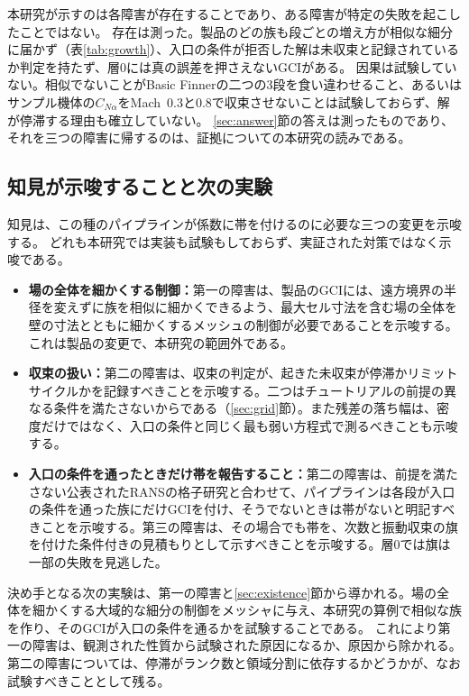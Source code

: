 \documentclass[twocolumn]{labreport}
\newcommand{\CNa}{C_{N\alpha}}
\begin{document}
本研究が示すのは各障害が存在することであり、ある障害が特定の失敗を起こしたことではない。
存在は測った。製品のどの族も段ごとの増え方が相似な細分に届かず（表\ref{tab:growth}）、入口の条件が拒否した解は未収束と記録されているか判定を持たず、層0には真の誤差を押さえないGCIがある。
因果は試験していない。相似でないことがBasic Finnerの二つの3段を食い違わせること、あるいはサンプル機体の$\CNa$をMach~0.3と0.8で収束させないことは試験しておらず、解が停滞する理由も確立していない。
\ref{sec:answer}節の答えは測ったものであり、それを三つの障害に帰するのは、証拠についての本研究の読みである。

\subsection{知見が示唆することと次の実験}
\label{sec:implications}

知見は、この種のパイプラインが係数に帯を付けるのに必要な三つの変更を示唆する。
どれも本研究では実装も試験もしておらず、実証された対策ではなく示唆である。
\begin{itemize}
\item \textbf{場の全体を細かくする制御：}第一の障害は、製品のGCIには、遠方境界の半径を変えずに族を相似に細かくできるよう、最大セル寸法を含む場の全体を壁の寸法とともに細かくするメッシュの制御が必要であることを示唆する。
これは製品の変更で、本研究の範囲外である。
\item \textbf{収束の扱い：}第二の障害は、収束の判定が、起きた未収束が停滞かリミットサイクルかを記録すべきことを示唆する。二つはチュートリアルの前提の異なる条件を満たさないからである（\ref{sec:grid}節）。また残差の落ち幅は、密度だけではなく、入口の条件と同じく最も弱い方程式で測るべきことも示唆する。
\item \textbf{入口の条件を通ったときだけ帯を報告すること：}第二の障害は、前提を満たさない公表されたRANSの格子研究と合わせて、パイプラインは各段が入口の条件を通った族にだけGCIを付け、そうでないときは帯がないと明記すべきことを示唆する。第三の障害は、その場合でも帯を、次数と振動収束の旗を付けた条件付きの見積もりとして示すべきことを示唆する。層0では旗は一部の失敗を見逃した。
\end{itemize}
決め手となる次の実験は、第一の障害と\ref{sec:existence}節から導かれる。場の全体を細かくする大域的な細分の制御をメッシャに与え、本研究の算例で相似な族を作り、そのGCIが入口の条件を通るかを試験することである。
これにより第一の障害は、観測された性質から試験された原因になるか、原因から除かれる。第二の障害については、停滞がランク数と領域分割に依存するかどうかが、なお試験すべきこととして残る。
\end{document}
